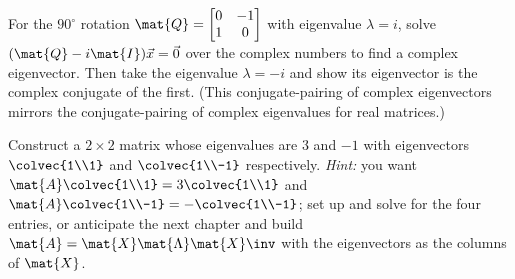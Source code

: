 \begin{exercise}
\label{ch23:ex-complex-evec}
For the $90^\circ$ rotation $\mat{Q}=\begin{bmatrix}0 & -1\\ 1 & 0\end{bmatrix}$
with eigenvalue $\lambda=i$, solve $(\mat{Q}-i\mat{I})\vec{x}=\vec{0}$ over the
complex numbers to find a complex eigenvector. Then take the eigenvalue
$\lambda=-i$ and show its eigenvector is the complex conjugate of the first. (This
conjugate-pairing of complex eigenvectors mirrors the conjugate-pairing of complex
eigenvalues for real matrices.)
\end{exercise}

\begin{exercise}
\label{ch23:ex-build}
Construct a $2\times 2$ matrix whose eigenvalues are $3$ and $-1$ with
eigenvectors $\colvec{1\\1}$ and $\colvec{1\\-1}$ respectively. \emph{Hint:} you
want $\mat{A}\colvec{1\\1}=3\colvec{1\\1}$ and $\mat{A}\colvec{1\\-1}=-\colvec{1\\-1}$;
set up and solve for the four entries, or anticipate the next chapter and build
$\mat{A}=\mat{X}\mat{\Lambda}\mat{X}\inv$ with the eigenvectors as the columns of
$\mat{X}$.
\end{exercise}
